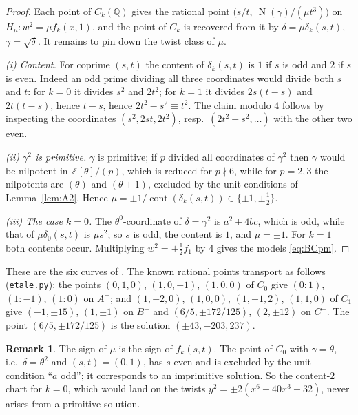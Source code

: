 \documentclass[11pt,reqno]{amsart}
\theoremstyle{plain}
\theoremstyle{definition}
\newtheorem{remark}[theorem]{Remark}
\newcommand{\Q}{\mathbb{Q}}
\newcommand{\Z}{\mathbb{Z}}
\DeclareMathOperator{\Nm}{N}
\DeclareMathOperator{\cont}{cont}
\numberwithin{equation}{section}
\begin{document}
\begin{proof}
Each point of $C_{k}(\Q)$ gives the rational point
$\bigl(s/t,\ \Nm(\gamma)/(\mu t^{3})\bigr)$ on $H_{\mu}\colon w^{2}=\mu f_{k}(x,1)$,
and the point of $C_{k}$ is recovered from it by $\delta=\mu\delta_{k}(s,t)$,
$\gamma=\sqrt{\delta}$. It remains to pin down the twist class of $\mu$.

\emph{(i) Content.} For coprime $(s,t)$ the content of $\delta_{k}(s,t)$ is $1$
if $s$ is odd and $2$ if $s$ is even. Indeed an odd prime dividing all three
coordinates would divide both $s$ and $t$: for $k=0$ it divides $s^{2}$ and
$2t^{2}$; for $k=1$ it divides $2s(t-s)$ and $2t(t-s)$, hence $t-s$, hence
$2t^{2}-s^{2}\equiv t^{2}$. The claim modulo $4$ follows by inspecting the
coordinates $(s^{2},2st,2t^{2})$, resp.\ $(2t^{2}-s^{2},\dots)$ with the other
two even.

\emph{(ii) $\gamma^{2}$ is primitive.} $\gamma$ is primitive; if $p$ divided all
coordinates of $\gamma^{2}$ then $\gamma$ would be nilpotent in
$\Z[\theta]/(p)$, which is reduced for $p\nmid6$, while for $p=2,3$ the
nilpotents are $(\theta)$ and $(\theta+1)$, excluded by the unit conditions of
Lemma~\ref{lem:A2}. Hence
$\mu=\pm1/\cont(\delta_{k}(s,t))\in\{\pm1,\pm\tfrac12\}$.

\emph{(iii) The case $k=0$.} The $\theta^{0}$-coordinate of $\delta=\gamma^{2}$
is $a^{2}+4bc$, which is odd, while that of $\mu\delta_{0}(s,t)$ is $\mu s^{2}$;
so $s$ is odd, the content is $1$, and $\mu=\pm1$. For $k=1$ both contents
occur. Multiplying $w^{2}=\pm\tfrac12 f_{1}$ by $4$ gives the models
\eqref{eq:BCpm}.
\end{proof}

These are the six curves of \cite{Villines}. The known rational points transport
as follows (\texttt{etale.py}): the points $(0,1,0)$, $(1,0,-1)$, $(1,0,0)$ of
$C_{0}$ give $(0:1)$, $(1:-1)$, $(1:0)$ on $A^{+}$; and $(1,-2,0)$, $(1,0,0)$,
$(1,-1,2)$, $(1,1,0)$ of $C_{1}$ give $(-1,\pm15)$, $(1,\pm1)$ on $B^{-}$ and
$(6/5,\pm172/125)$, $(2,\pm12)$ on $C^{+}$. The point $(6/5,\pm172/125)$ is the
solution $(\pm43,-203,237)$.

\begin{remark}
The sign of $\mu$ is the sign of $f_{k}(s,t)$. The point of $C_{0}$ with
$\gamma=\theta$, i.e.\ $\delta=\theta^{2}$ and $(s,t)=(0,1)$, has $s$ even and is
excluded by the unit condition ``$a$ odd''; it corresponds to an imprimitive
solution. So the content-$2$ chart for $k=0$, which would land on the twists
$y^{2}=\pm2(x^{6}-40x^{3}-32)$, never arises from a primitive solution.
\end{remark}
\end{document}

